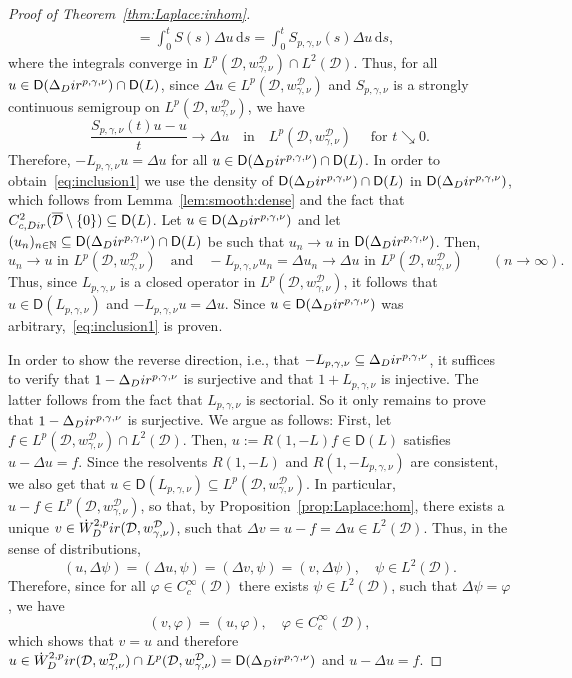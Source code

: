 \documentclass[10pt,a4paper]{amsart}
\newcommand{\Dir}{\textup{Dir}}
\newcommand{\N}{\ensuremath{\mathbb{N}}}
\newcommand{\calD}{\ensuremath{\mathcal{D}}}
\newcommand{\sfD}{\ensuremath{\mathsf{D}}}
\begin{document}
\begin{proof}[Proof of Theorem~\ref{thm:Laplace:inhom}]
\begin{align*}
&=
\int_0^t S(s) \Delta u\,\mathrm{d}s
=
\int_0^t S_{p,\gamma,\nu}(s) \Delta u\,\mathrm{d}s,
\end{align*}
where the integrals converge in $L^p(\calD,w_{\gamma,\nu}^{\calD})\cap L^2(\calD)$.
Thus,
for all $u\in \sfD(\Delta_\Dir^{p,\gamma,\nu}) \cap \sfD(L)$,
since $\Delta u\in L^p(\calD,w_{\gamma,\nu}^\calD)$ and $S_{p,\gamma,\nu}$ is a strongly continuous semigroup on $L^p(\calD,w^\calD_{\gamma,\nu})$, we have 
\[
\frac{S_{p,\gamma,\nu}(t)u - u}{t}
\longrightarrow 
\Delta u
\quad \text{in} \quad L^p(\calD,w_{\gamma,\nu}^\calD)\quad  \text{ for } t\searrow  0.
\]
Therefore, 
$-L_{p,\gamma,\nu}u = \Delta u$ 
for all $u\in \sfD(\Delta_\Dir^{p,\gamma,\nu}) \cap \sfD(L)$.
In order to obtain~\eqref{eq:inclusion1} we use the density of $\sfD(\Delta_\Dir^{p,\gamma,\nu}) \cap \sfD(L)$ in $\sfD(\Delta_\Dir^{p,\gamma,\nu})$, which follows from Lemma~\ref{lem:smooth:dense} and the fact that 
$C_{c,\Dir}^2(\overline{\calD}\setminus\{0\})\subseteq \sfD(L)$.
Let $u\in \sfD(\Delta_\Dir^{p,\gamma,\nu})$ and let $(u_n)_{n\in\N}\subseteq \sfD(\Delta_\Dir^{p,\gamma,\nu}) \cap \sfD(L)$ be such that $u_n\to u$ in $\sfD(\Delta_\Dir^{p,\gamma,\nu})$. Then, 
\[
u_n\to u \text{ in } L^p(\calD,w_{\gamma,\nu}^\calD) \quad \text{and}\quad -L_{p,\gamma,\nu} u_n=\Delta u_n\to \Delta u\text{ in } L^p(\calD,w_{\gamma,\nu}^\calD)\qquad (n\to\infty).
\]
Thus, since $L_{p,\gamma,\nu}$ is a closed operator in $L^p(\calD,w_{\gamma,\nu}^\calD)$, it follows that $u\in \sfD(L_{p,\gamma,\nu})$ and $-L_{p,\gamma,\nu}u=\Delta u$. Since $u\in\sfD(\Delta_\Dir^{p,\gamma,\nu})$ was arbitrary,~\eqref{eq:inclusion1} is proven.

In order to show the reverse direction, i.e., that $-L_{p,\gamma,\nu}\subseteq \Delta_\Dir^{p,\gamma,\nu}$, it suffices to verify that $1-\Delta_\Dir^{p,\gamma,\nu}$ is surjective and that $1+L_{p,\gamma,\nu}$ is injective. The latter follows from the fact that $L_{p,\gamma,\nu}$ is sectorial. 
So it only remains to prove that $1-\Delta_\Dir^{p,\gamma,\nu}$ is surjective. We argue as follows:
First, let  $f\in L^p(\calD,w_{\gamma,\nu}^\calD)\cap L^2(\calD)$. Then, $u:=R(1,-L)f\in\sfD(L)$ satisfies $u-\Delta u = f$. Since the resolvents $R(1,-L)$ and $R(1,-L_{p,\gamma,\nu})$ are consistent, we also get that $u\in\sfD(L_{p,\gamma,\nu})\subseteq L^p(\calD,w_{\gamma,\nu}^\calD)$. 
In particular, $u-f\in L^p(\calD,w_{\gamma,\nu}^\calD)$, so that, by Proposition~\ref{prop:Laplace:hom}, there exists a unique $v\in\Dot{W}^{2,p}_\Dir(\calD,w_{\gamma,\nu}^\calD)$, such that $\Delta v = u-f =\Delta u\in L^2(\calD)$. Thus, in the sense of distributions,
\[
(u,\Delta\psi) = (\Delta u,\psi) = (\Delta v,\psi) = (v,\Delta\psi), \quad \psi\in L^2(\calD).
\]
Therefore,
since for all $\varphi\in C_c^\infty(\calD)$ there exists $\psi\in L^2(\calD)$, such that $\Delta\psi=\varphi$, we have 
\[
(v,\varphi)= (u,\varphi),\quad\varphi\in C_c^\infty(\calD),
\]
which shows that $v=u$ and therefore $u\in \Dot{W}^{2,p}_\Dir(\calD,w_{\gamma,\nu}^\calD)\cap L^p(\calD,w_{\gamma,\nu}^\calD) = \sfD(\Delta_\Dir^{p,\gamma,\nu})$ and $u-\Delta u=f$.



\end{proof}
\end{document}
